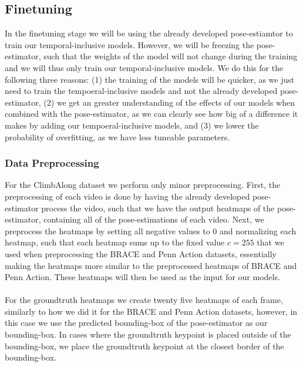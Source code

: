\documentclass[./main.tex]{subfiles}
\begin{document}
\subsection{Finetuning}
In the finetuning stage we will be using the already developed pose-estiamtor to train our temporal-inclusive models. However, we will be freezing the pose-estimator, such that the weights of the model will not change during the training and we will thus only train our temporal-inclusive models. We do this for the following three reasons: (1) the training of the models will be quicker, as we just need to train the tempoeral-inclusive models and not the already developed pose-estimator, (2) we get an greater understanding of the effects of our models when combined with the pose-estimator, as we can clearly see how big of a difference it makes by adding our tempoeral-inclusive models, and (3) we lower the probability of overfitting, as we have less tuneable parameters.

\subsubsection{Data Preprocessing}
For the ClimbAlong dataset we perform only minor preprocessing. First, the preprocessing of each video is done by having the already developed pose-estimator process the video, such that we have the output heatmaps of the pose-estimator, containing all of the pose-estimations of each video. Next, we preprocess the heatmaps by setting all negative values to $0$ and normalizing each heatmap, such that each heatmap sums up to the fixed value $c = 255$ that we used when preprocessing the BRACE and Penn Action datasets, essentially making the heatmaps more similar to the preprocessed heatmaps of BRACE and Penn Action. These heatmaps will then be used as the input for our models.
\\
\\
For the groundtruth heatmaps we create twenty five heatmaps of each frame, similarly to how we did it for the BRACE and Penn Action datasets, however, in this case we use the predicted bounding-box of the pose-estimator as our bounding-box. In cases where the groundtruth keypoint is placed outside of the bounding-box, we place the groundtruth keypoint at the closest border of the bounding-box.
\end{document}
